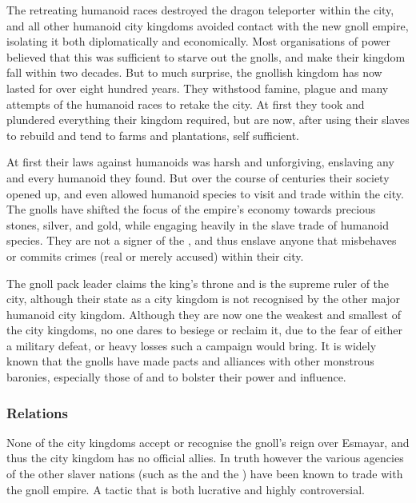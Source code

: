 The retreating humanoid races destroyed the dragon teleporter within the city,
and all other humanoid city kingdoms avoided contact with the new gnoll
empire, isolating it both diplomatically and economically. Most organisations
of power believed that this was sufficient to starve out the gnolls, and make
their kingdom fall within two decades. But to much surprise, the gnollish
kingdom has now lasted for over eight hundred years. They withstood famine,
plague and many attempts of the humanoid races to retake the city. At first
they took and plundered everything their kingdom required, but are now, after
using their slaves to rebuild and tend to farms and plantations, self
sufficient.

At first their laws against humanoids was harsh and unforgiving, enslaving any
and every humanoid they found. But over the course of centuries their society
opened up, and even allowed humanoid species to visit and trade within the
city. The gnolls have shifted the focus of the empire's economy towards
precious stones, silver, and gold, while engaging heavily in the slave trade
of humanoid species. They are not a signer of the ,
and thus enslave anyone that misbehaves or commits crimes (real or merely
accused) within their city.

The gnoll pack leader claims the king's throne and is the supreme ruler of the
city, although their state as a city kingdom is not recognised by the other
major humanoid city kingdom. Although they are now one the weakest and
smallest of the city kingdoms, no one dares to besiege or reclaim it, due to
the fear of either a military defeat, or heavy losses such a campaign would
bring. It is widely known that the gnolls have made pacts and alliances with
other monstrous baronies, especially those of  and
 to bolster their power and influence.

\subsubsection{Relations}


None of the city kingdoms accept or recognise the gnoll's reign over Esmayar,
and thus the city kingdom has no official allies. In truth however the various
agencies of the other slaver nations (such as the 
and the ) have been known to trade with the gnoll
empire. A tactic that is both lucrative and highly controversial.

